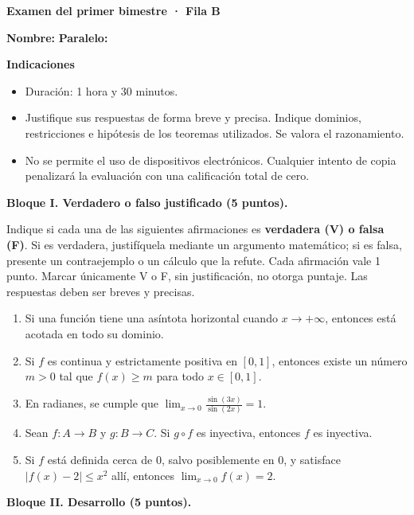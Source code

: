 \documentclass[10pt,a5paper]{article}
\begin{document}
\begin{center}
  {\color{Azul}\large\bfseries Examen del primer bimestre · Fila B}
\end{center}
\noindent\textbf{Nombre:} \hrulefill\quad\textbf{Paralelo:} \makebox[15mm]{\hrulefill}
\medskip

\noindent\textbf{Indicaciones}
\begin{itemize}
  \item Duración: 1 hora y 30 minutos.
  \item Justifique sus respuestas de forma breve y precisa. Indique dominios, restricciones e hipótesis de los teoremas utilizados. Se valora el razonamiento.
  \item No se permite el uso de dispositivos electrónicos. Cualquier intento de copia penalizará la evaluación con una calificación total de cero.
\end{itemize}

\noindent\textbf{Bloque I. Verdadero o falso justificado (5 puntos).}

\smallskip
\noindent Indique si cada una de las siguientes afirmaciones es \textbf{verdadera (V) o falsa (F)}. Si es verdadera, justifíquela mediante un argumento matemático; si es falsa, presente un contraejemplo o un cálculo que la refute. Cada afirmación vale 1 punto. Marcar únicamente V o F, sin justificación, no otorga puntaje. Las respuestas deben ser breves y precisas.
\begin{enumerate}
  \item Si una función tiene una asíntota horizontal cuando $x\to+\infty$, entonces está acotada en todo su dominio.
  \item Si $f$ es continua y estrictamente positiva en $[0,1]$, entonces existe un número $m>0$ tal que $f(x)\geq m$ para todo $x\in[0,1]$.
  \item En radianes, se cumple que $\displaystyle\lim_{x\to0}\frac{\sin(3x)}{\sin(2x)}=1$.
  \item Sean $f\colon A\to B$ y $g\colon B\to C$. Si $g\circ f$ es inyectiva, entonces $f$ es inyectiva.
  \item Si $f$ está definida cerca de $0$, salvo posiblemente en $0$, y satisface $|f(x)-2|\leq x^2$ allí, entonces $\lim_{x\to0}f(x)=2$.
\end{enumerate}

\medskip
\noindent\textbf{Bloque II. Desarrollo (5 puntos).}
\end{document}
